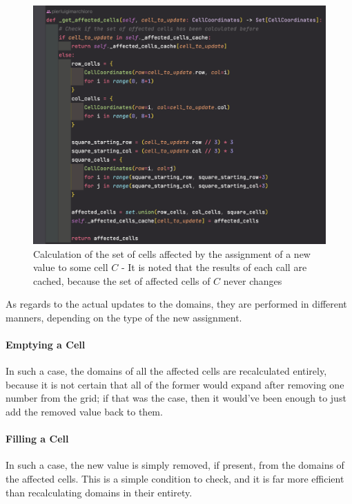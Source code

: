 \begin{figure}[h]
    \centering
    \includegraphics[scale=0.65]{assignment-1/images/cp/domains-3-calc-affected-doms.png}
    \caption{Calculation of the set of cells affected by the assignment of a new value to some cell $C$ - It is noted that the results of each call are cached, because the set of affected cells of $C$ never changes}
    \label{fig:domain_3}
\end{figure}

\par
As regards to the actual updates to the domains, they are performed in different manners, depending on the type of the new assignment.

\paragraph{Emptying a Cell} In such a case, the domains of all the affected cells are recalculated entirely, because it is not certain that all of the former would expand after removing one number from the grid; if that was the case, then it would've been enough to just add the removed value back to them.

\paragraph{Filling a Cell} In such a case, the new value is simply removed, if present, from the domains of the affected cells. This is a simple condition to check, and it is far more efficient than recalculating domains in their entirety.

